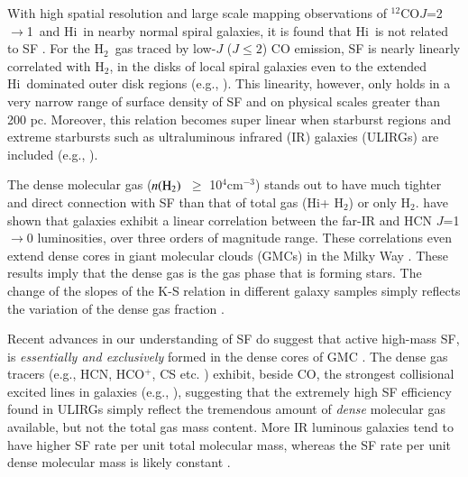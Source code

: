 \documentclass[legal,11pt]{article}
\def\cmt   {cm$^{-3}$\,}
\def\,{\thinspace}
\def\HI{H{\sc i}}
\def\Htwo{H$_2$}
\def\nHtwo{$n({\rm H}_2)$}
\def\Htwo       {H$_2$}
\def\COto      {$^{12}$CO$J$=2$\rightarrow$1}
\begin{document}
With high spatial resolution and large scale mapping observations of \COto\ and
\HI\ in nearby normal spiral galaxies, it is found that \HI\ is not related to
SF \citep[e.g.,][]{Bigiel2008}. For the \Htwo\ gas traced by low-$J$ ($J\le2$)
CO emission, SF is nearly linearly correlated with \Htwo, in the disks of local
spiral galaxies even to the extended \HI\ dominated outer disk
regions (e.g., \citealt{Bigiel2008,Schruba2011,Leroy2013}). This linearity,
however, only holds in a very narrow range of surface density of SF and on
physical scales greater than 200 pc.  Moreover, this relation becomes super
linear when starburst regions and extreme starbursts such as ultraluminous
infrared (IR) galaxies (ULIRGs) are included (e.g.,
\citealt{Genzel2010,Daddi2010a}).  


The dense molecular gas (\nHtwo\ $\ge$ 10$^4$\cmt) stands out to have much
tighter and direct connection with SF than that of total gas (\HI + \Htwo) or
only \Htwo. \citet[][Fig. 1]{gs04a,gs04b} have shown that galaxies exhibit a
linear correlation between the far-IR and HCN $J$=1$\rightarrow$0 luminosities,
over three orders of magnitude range. These correlations even extend dense
cores in giant molecular clouds (GMCs) in the Milky Way \citep{weg05,zgh2014}.
These results imply that the dense gas is the gas phase that is forming
stars. The change of the slopes of the K-S relation in different galaxy samples
simply reflects the variation of the dense gas fraction \citep[e.g.,][]{Lada2010b}. 

Recent advances in our understanding of SF do suggest that active high-mass SF,
is {\it essentially and exclusively} formed in the dense cores of GMC
\citep[e.g.,][]{Evans08}. The dense gas tracers (e.g., HCN, HCO$^+$, CS etc. )
exhibit, beside CO, the strongest collisional excited lines in galaxies (e.g.,
\citealt{rwc06,gc08,Baan08,Greve14}), suggesting that the extremely high SF
efficiency found in ULIRGs simply reflect the tremendous amount of {\it dense}
molecular gas available, but not the total gas mass
content\citep[e.g.,][]{Lada2010b}.  More IR luminous galaxies tend to have
higher SF rate per unit total molecular mass, whereas the SF rate per unit
dense molecular mass is likely constant \citep[][]{gs04a,gs04b}.
\end{document}

